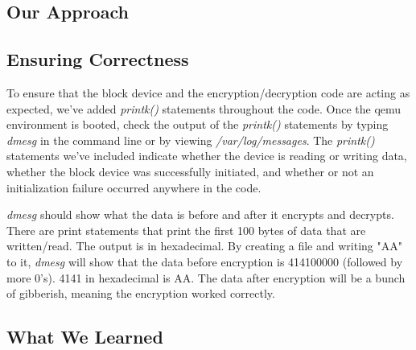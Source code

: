 \documentclass[draftclsnofoot, onecolumn, 10pt, compsoc]{IEEEtran}
\begin{document}
		\subsection{Our Approach}
		\subsection{Ensuring Correctness}
			To ensure that the block device and the encryption/decryption code are acting as expected, we've added \textit{printk()} statements throughout the code. Once the qemu environment is booted, check the output of the \textit{printk()} statements by typing \textit{dmesg} in the command line or by viewing \textit{/var/log/messages}. The \textit{printk()} statements we've included indicate whether the device is reading or writing data, whether the block device was successfully initiated, and whether or not an initialization failure occurred anywhere in the code.
			
			\textit{dmesg} should show what the data is before and after it encrypts and decrypts.
			There are print statements that print the first 100 bytes of data that are written/read. 
			The output is in hexadecimal.
			By creating a file and writing "AA" to it, \textit{dmesg} will show that the data before encryption is 414100000 (followed by more 0's). 
			4141 in hexadecimal is AA.
			The data after encryption will be a bunch of gibberish, meaning the encryption worked correctly.
		\subsection{What We Learned}
\end{document}
